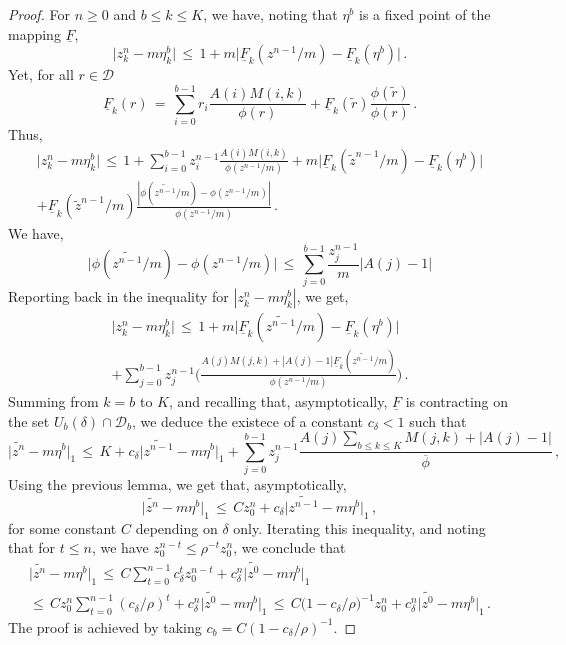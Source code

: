 \documentclass[a4paper,12pt]{article}
\theoremstyle{definition}
\theoremstyle{remark}
\def \cD {\mathcal{D}}
\def \d {\delta}
\begin{document}
\begin{proof}
For $n\geq 0$ and $b\leq k\leq K$, we have,
noting that $\eta^b$ is a fixed point of the mapping $\underline{F}$,
$$\big|
z^n_k-m\eta^b_k
\big|\,\leq\,1+m\big|
\underline{F}_k(z^{n-1}/m)-\underline{F}_k(\eta^b)
\big|\,.$$
Yet, for all $r\in\cD$
$$\underline{F}_k(r)\,=\,\sum_{i=0}^{b-1}r_i\frac{A(i)M(i,k)}{\phi(r)}
+\underline{F}_k(\widetilde{r})\frac{\phi(\widetilde{r})}{\phi(r)}\,.$$
Thus,
\begin{multline*}\big|
z^n_k-m\eta^b_k
\big|\,\leq\,1+\sum_{i=0}^{b-1}z^{n-1}_i\frac{A(i)M(i,k)}{\phi(z^{n-1}/m)}+m\big|
\underline{F}_k(\widetilde{z}^{n-1}/m)-\underline{F}_k(\eta^b)
\big|\\+\underline{F}_k(\widetilde{z}^{n-1}/m)\frac{|\phi(\widetilde{z^{n-1}}/m)-\phi(z^{n-1}/m)|}{\phi(z^{n-1}/m)}\,.
\end{multline*}
We have,
$$\big|
\phi(\widetilde{z^{n-1}}/m)-\phi(z^{n-1}/m)
\big|\,\leq\,\sum_{j=0}^{b-1}\frac{z_j^{n-1}}{m}|A(j)-1|$$
Reporting back in the inequality for $|z^n_k-m\eta^b_k|$, we get,
\begin{multline*}
\big|
z^n_k-m\eta^b_k
\big|\,\leq\,1+m\bigg|
\underline{F}_k(
\widetilde{z^{n-1}}/m)-\underline{F}_k(\eta^b)
\bigg|\\
+\sum_{j=0}^{b-1}z^{n-1}_j\Bigg(
\frac{A(j)M(j,k)+|A(j)-1|\underline{F}_k(\widetilde{z^{n-1}}/m)}{\phi(z^{n-1}/m)}
\Bigg)
\,.
\end{multline*}
Summing from $k=b$ to $K$,
and recalling that, asymptotically, $\underline{F}$ is contracting on the set $U_b(\d)\cap\cD_b$, 
we deduce the existece of a constant $c_\d<1$ such that
$$
\big|
\widetilde{z^n}-m\eta^b
\big|_1\,\leq\,
K+c_\d\big|
\widetilde{z^{n-1}}-m\eta^b
\big|_1+
\sum_{j=0}^{b-1}z_j^{n-1}\frac{A(j)\displaystyle\sum_{b\leq k\leq K}M(j,k)+|A(j)-1|}{\overline{\phi}}
\,,
$$
Using the previous lemma, we get
that, asymptotically,
$$\big|
\widetilde{z^n}-m\eta^b
\big|_1\,\leq\,Cz^n_0+c_\d\big|
\widetilde{z^{n-1}}-m\eta^b
\big|_1\,,$$
for some constant $C$ depending on $\d$ only.
Iterating this inequality,
and noting that for $t\leq n$, we have $z^{n-t}_0\leq \rho^{-t}z_0^n$,
we conclude that
\begin{multline*}
\big|
\widetilde{z^n}-m\eta^b
\big|_1\,\leq\,C\sum_{t=0}^{n-1}c_\d^tz_0^{n-t}+c_\d^n\big|
\widetilde{z^0}-m\eta^b
\big|_1\\
\leq\,Cz_0^n\sum_{t=0}^{n-1}(c_\d/\rho)^t+c_\d^n\big|
\widetilde{z^0}-m\eta^b
\big|_1\,\leq\,
C\big(
1-c_\d/\rho
\big)^{-1}z_0^n+c_\d^n\big|
\widetilde{z^0}-m\eta^b
\big|_1\,.
\end{multline*}
The proof is achieved by taking $c_b=C(1-c_\d/\rho)^{-1}$.
\end{proof}
\end{document}
